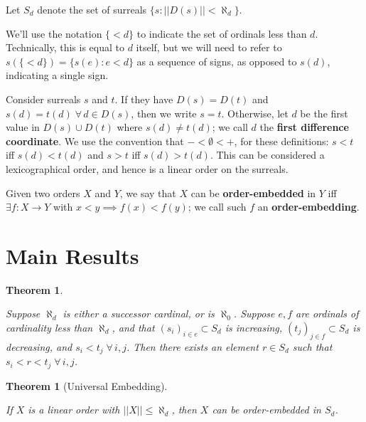 \documentclass[11pt]{amsart}
\newtheorem{Thm}[Def]{Theorem}
\begin{document}
Let {\boldmath $S_d$} denote the set of surreals $\{s : ||D(s)|| < \aleph_d\}$.

We'll use the notation $\{<d\}$ to indicate the set of ordinals less than $d$.  Technically, this is
equal to $d$ itself, but we will need to refer to $s(\{<d\}) = \{s(e) : e < d\}$ as a sequence of signs,
as opposed to $s(d)$, indicating a single sign.

Consider surreals $s$ and $t$.  If they have $D(s)=D(t)$ and $s(d)=t(d)\; \forall\, d\in D(s)$, then we write
$s=t$.  Otherwise, let $d$ be the first value in $D(s)\cup D(t)$ where $s(d)\ne t(d)$; we call $d$
the {\bf first difference coordinate}.
We use the convention that $- < \emptyset < +$, for these definitions: $s<t$ iff $s(d) < t(d)$
 and $s>t$ iff $s(d)>t(d)$. 
This can be considered a lexicographical order, and hence is a linear order on the surreals.

Given two orders $X$ and $Y$, we say that $X$ can be {\bf order-embedded} in $Y$ iff
$\exists f:X\to Y$ with $x < y \implies f(x) < f(y)$; we call such $f$ an {\bf order-embedding}.


\section{Main Results}


\newcommand{\densitytheorem}{
Suppose $\aleph_d$ is either a successor cardinal, or is $\aleph_0$.
Suppose $e,f$ are ordinals of cardinality less than $\aleph_d$, and that
$(s_i)_{i\in e}\subset S_d$ is increasing, $(t_j)_{j\in f}\subset S_d$ is decreasing, and
$s_i < t_j \;\forall\, i,j$.
Then there exists an
element $r\in S_d$ such that $s_i < r < t_j \;\forall\, i,j$.
}

\begin{Thm}\label{nested_intervals_result}
\densitytheorem
\end{Thm}


\newcommand{\universaltheorem}{
If $X$ is a linear order with $||X|| \le \aleph_d$, then $X$ can be order-embedded in $S_d$.
}

\begin{Thm}[Universal Embedding]\label{canonical_orders_result}
\universaltheorem
\end{Thm}
\end{document}
